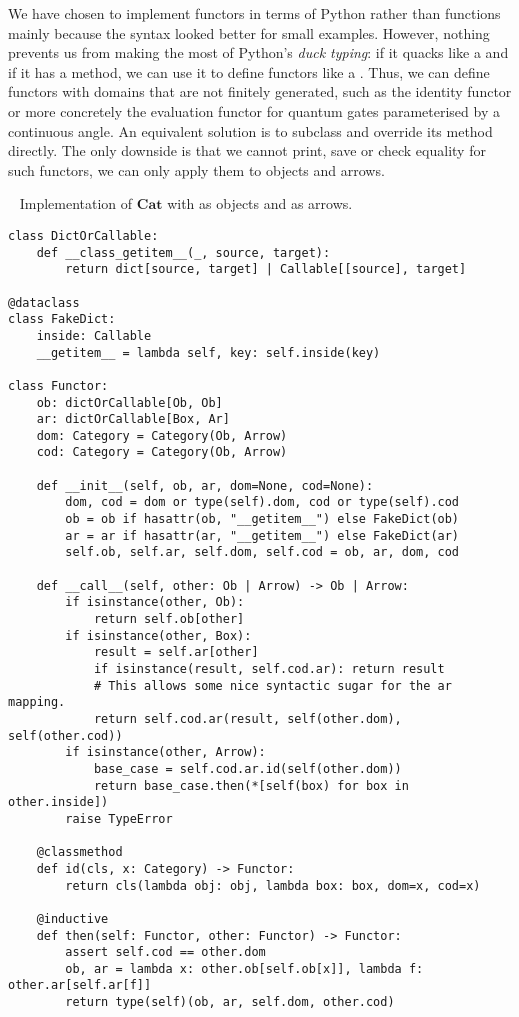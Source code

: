 We have chosen to implement functors in terms of Python  rather than functions mainly because the syntax looked better for small examples.
However, nothing prevents us from making the most of Python's \emph{duck typing}: if it quacks like a  and if it has a  method, we can use it to define functors like a .
Thus, we can define functors with domains that are not finitely generated, such as the identity functor or more concretely the evaluation functor for quantum gates parameterised by a continuous angle.
An equivalent solution is to subclass  and override its  method directly.
The only downside is that we cannot print, save or check equality for such functors, we can only apply them to objects and arrows.

\begin{python}~\label{listing:Functor}
{\normalfont Implementation of $\mathbf{Cat}$ with  as objects and  as arrows.}

\begin{verbatim}
class DictOrCallable:
    def __class_getitem__(_, source, target):
        return dict[source, target] | Callable[[source], target]

@dataclass
class FakeDict:
    inside: Callable
    __getitem__ = lambda self, key: self.inside(key)

class Functor:
    ob: dictOrCallable[Ob, Ob]
    ar: dictOrCallable[Box, Ar]
    dom: Category = Category(Ob, Arrow)
    cod: Category = Category(Ob, Arrow)

    def __init__(self, ob, ar, dom=None, cod=None):
        dom, cod = dom or type(self).dom, cod or type(self).cod
        ob = ob if hasattr(ob, "__getitem__") else FakeDict(ob)
        ar = ar if hasattr(ar, "__getitem__") else FakeDict(ar)
        self.ob, self.ar, self.dom, self.cod = ob, ar, dom, cod

    def __call__(self, other: Ob | Arrow) -> Ob | Arrow:
        if isinstance(other, Ob):
            return self.ob[other]
        if isinstance(other, Box):
            result = self.ar[other]
            if isinstance(result, self.cod.ar): return result
            # This allows some nice syntactic sugar for the ar mapping.
            return self.cod.ar(result, self(other.dom), self(other.cod))
        if isinstance(other, Arrow):
            base_case = self.cod.ar.id(self(other.dom))
            return base_case.then(*[self(box) for box in other.inside])
        raise TypeError

    @classmethod
    def id(cls, x: Category) -> Functor:
        return cls(lambda obj: obj, lambda box: box, dom=x, cod=x)

    @inductive
    def then(self: Functor, other: Functor) -> Functor:
        assert self.cod == other.dom
        ob, ar = lambda x: other.ob[self.ob[x]], lambda f: other.ar[self.ar[f]]
        return type(self)(ob, ar, self.dom, other.cod)
\end{verbatim}
\end{python}

